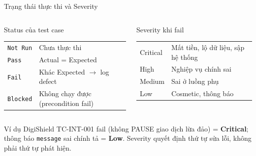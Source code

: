 \documentclass[aspectratio=169,12pt]{beamer}
\begin{document}
\begin{frame}{Trạng thái thực thi và Severity}
  \begin{columns}[T]
    \begin{block}{Status của test case}
      \small
      \begin{tabular}{p{1.9cm}p{3.3cm}}
        \texttt{Not Run} & Chưa thực thi \\
        \texttt{Pass}    & Actual = Expected \\
        \texttt{Fail}    & Khác Expected $\to$ log defect \\
        \texttt{Blocked} & Không chạy được (precondition fail) \\
      \end{tabular}
    \end{block}

    \begin{block}{Severity khi fail}
      \small
      \begin{tabular}{p{1.9cm}p{3.4cm}}
        Critical & Mất tiền, lộ dữ liệu, sập hệ thống \\
        High     & Nghiệp vụ chính sai \\
        Medium   & Sai ở luồng phụ \\
        Low      & Cosmetic, thông báo \\
      \end{tabular}
    \end{block}
  \end{columns}

  \vspace{0.3em}
  \begin{exampleblock}{Ví dụ DigiShield}
    \small TC-INT-001 fail (không PAUSE giao dịch lừa đảo) = \textbf{Critical};
    thông báo \texttt{message} sai chính tả = \textbf{Low}.
    Severity quyết định thứ tự sửa lỗi, không phải thứ tự phát hiện.
  \end{exampleblock}
\end{frame}
\end{document}
